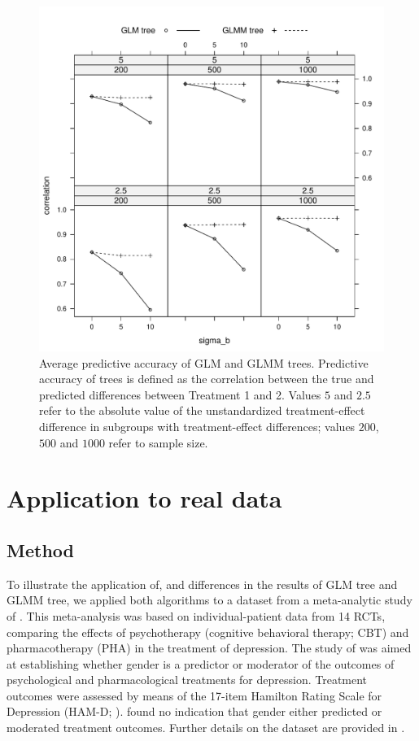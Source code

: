 \documentclass[nobf,doc]{apa}
\begin{document}
\begin{figure}[!htbp]
	\includegraphics[width=12cm]{xy_correlations.pdf}
	\caption{Average predictive accuracy of GLM and GLMM trees. Predictive accuracy of trees is defined as the correlation between the true and predicted differences between Treatment 1 and 2. Values $5$ and $2.5$ refer to the absolute value of the unstandardized treatment-effect difference in subgroups with treatment-effect differences; values $200$, $500$ and $1000$ refer to sample size.}
	\label{fig:xyplot_correlations}
\end{figure}



\section{Application to real data}

\subsection{Method}

To illustrate the application of, and differences in the results of GLM tree and GLMM tree, we applied both algorithms to a dataset from a meta-analytic study of . This meta-analysis was based on individual-patient data from 14 RCTs, comparing the effects of psychotherapy (cognitive behavioral therapy; CBT) and pharmacotherapy (PHA) in the treatment of depression. The study of  was aimed at establishing whether gender is a predictor or moderator of the outcomes of psychological and pharmacological treatments for depression. Treatment outcomes were assessed by means of the 17-item Hamilton Rating Scale for Depression (HAM-D; ).  found no indication that gender either predicted or moderated treatment outcomes. Further details on the dataset are provided in .
\end{document}
